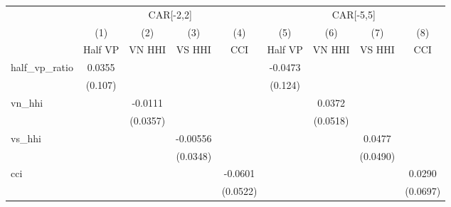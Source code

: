 {
\def\sym#1{\ifmmode^{#1}\else\(^{#1}\)\fi}
\begin{tabular}{l*{8}{c}}
\hline\hline
                    &\multicolumn{4}{c}{CAR[-2,2]}                                                          &\multicolumn{4}{c}{CAR[-5,5]}                                                          \\
                    &\multicolumn{1}{c}{(1)}&\multicolumn{1}{c}{(2)}&\multicolumn{1}{c}{(3)}&\multicolumn{1}{c}{(4)}&\multicolumn{1}{c}{(5)}&\multicolumn{1}{c}{(6)}&\multicolumn{1}{c}{(7)}&\multicolumn{1}{c}{(8)}\\
                    &\multicolumn{1}{c}{Half VP}&\multicolumn{1}{c}{VN HHI}&\multicolumn{1}{c}{VS HHI}&\multicolumn{1}{c}{CCI}&\multicolumn{1}{c}{Half VP}&\multicolumn{1}{c}{VN HHI}&\multicolumn{1}{c}{VS HHI}&\multicolumn{1}{c}{CCI}\\
\hline
half\_vp\_ratio       &      0.0355         &                     &                     &                     &     -0.0473         &                     &                     &                     \\
                    &     (0.107)         &                     &                     &                     &     (0.124)         &                     &                     &                     \\
vn\_hhi              &                     &     -0.0111         &                     &                     &                     &      0.0372         &                     &                     \\
                    &                     &    (0.0357)         &                     &                     &                     &    (0.0518)         &                     &                     \\
vs\_hhi              &                     &                     &    -0.00556         &                     &                     &                     &      0.0477         &                     \\
                    &                     &                     &    (0.0348)         &                     &                     &                     &    (0.0490)         &                     \\
cci                 &                     &                     &                     &     -0.0601         &                     &                     &                     &      0.0290         \\
                    &                     &                     &                     &    (0.0522)         &                     &                     &                     &    (0.0697)         \\

\end{tabular}}

